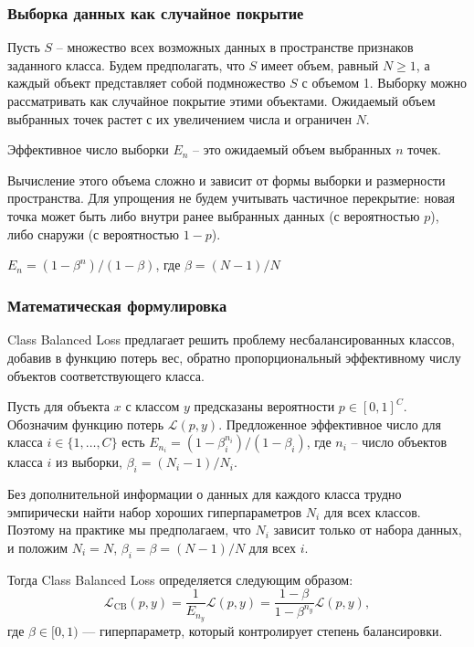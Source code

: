 \subsubsection*{Выборка данных как случайное покрытие}

Пусть $S$ -- множество всех возможных данных в пространстве признаков заданного класса. Будем предполагать, что 
$S$ имеет объем, равный $N\ge1$, а каждый объект представляет собой подмножество $S$ с объемом 1. Выборку можно рассматривать как случайное покрытие этими объектами. Ожидаемый объем выбранных точек растет с их увеличением числа и ограничен $N$. 

\begin{definition}
    Эффективное число выборки $E_n$ -- это ожидаемый объем выбранных $n$ точек.
\end{definition}

Вычисление этого объема сложно и зависит от формы выборки и размерности пространства. Для упрощения не будем учитывать частичное перекрытие: новая точка может быть либо внутри ранее выбранных данных (с вероятностью $p$), либо снаружи (с вероятностью $1-p$).

\begin{proposition}
    $E_n=(1-\beta^n)/(1-\beta)$, где $\beta=(N-1)/N$
\end{proposition}

\subsubsection*{Математическая формулировка}

Class Balanced Loss предлагает решить проблему несбалансированных классов, добавив в функцию потерь вес, обратно пропорциональный эффективному числу объектов соответствующего класса. 

Пусть для объекта $x$ с классом $y$ предсказаны вероятности $p\in[0,1]^C$. Обозначим функцию потерь $\mathcal{L}(p,y)$. Предложенное эффективное число для класса $i\in\{1,\ldots,C\}$ есть $E_{n_i}=(1-\beta_i^{n_i})/(1-\beta_i)$, где $n_i$ -- число объектов класса $i$ из выборки, $\beta_i=(N_i-1)/N_i$.

Без дополнительной информации о данных для каждого класса трудно эмпирически найти набор хороших гиперпараметров $N_i$ для всех классов. Поэтому на практике мы предполагаем, что $N_i$ зависит только от набора данных, и положим $N_i = N$, $\beta_i = \beta = (N - 1)/N$ для всех $i$.

Тогда Class Balanced Loss определяется следующим образом:
\[
    \mathcal{L}_\text{CB}(p,y) = \dfrac{1}{E_{n_y}}\mathcal{L}(p,y) = \dfrac{1-\beta}{1-\beta^{n_y}}\mathcal{L}(p,y),
\]
где $\beta \in [0,1)$ — гиперпараметр, который контролирует степень балансировки.

